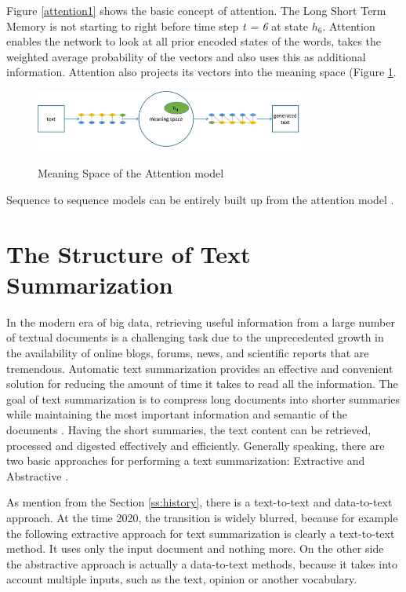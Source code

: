 Figure \ref{attention1} shows the basic concept of attention. The Long Short Term Memory is not starting to right before time step \textit{t = 6} at state \textit{\(h_{6}\)}. Attention enables the network to look at all prior encoded states of the words, takes the weighted average probability of the vectors and also uses this as additional information. Attention also projects its vectors into the meaning space (Figure \ref{meaningspace}. 

\begin{figure}
	\begin{center}
		\includegraphics[width=3.5in]{photos/w1-21}\\
		\caption{Meaning Space of the Attention model \cite{mugan}}\label{meaningspace}
	\end{center}
\end{figure}

Sequence to sequence models can be entirely built up from the attention model \cite{attention2}. 

\section{The Structure of Text Summarization}

In the modern era of big data, retrieving useful information from a large number of textual documents is a challenging task due to the unprecedented growth in the availability of online blogs, forums, news, and scientific reports that are tremendous. Automatic text summarization provides an effective and convenient solution for reducing the amount of time it takes to read all the information. The goal of text summarization is to compress long documents into shorter summaries while maintaining the most important information and semantic of the documents \cite{ts-intro} \cite{ts-intro2}. Having the short summaries, the text content can be retrieved, processed and digested effectively and efficiently. 
Generally speaking, there are two basic approaches for performing a text summarization: Extractive and Abstractive \cite{ts-intro3}. 

As mention from the Section \ref{ss:history}, there is a text-to-text and data-to-text approach. At the time 2020, the transition is widely blurred, because for example the following extractive approach for text summarization is clearly a text-to-text method. It uses only the input document and nothing more. On the other side the abstractive approach is actually a data-to-text methods, because it takes into account multiple inputs, such as the text, opinion or another vocabulary.



